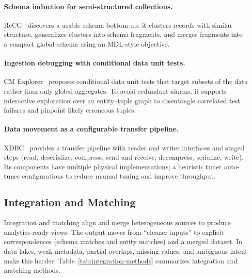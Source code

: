 \documentclass[sigconf,nonacm]{acmart}
\begin{document}
\paragraph{Schema induction for semi-structured collections.}
ReCG~\cite{10.14778/3681954.3682019} discovers a usable schema bottom-up: it clusters records with similar structure, generalizes clusters into schema fragments, and merges fragments into a compact global schema using an MDL-style objective.

\paragraph{Ingestion debugging with conditional data unit tests.}
CM Explorer~\cite{10.14778/3611540.3611595} proposes conditional data unit tests that target subsets of the data rather than only global aggregates. To avoid redundant alarms, it supports interactive exploration over an entity--tuple graph to disentangle correlated test failures and pinpoint likely erroneous tuples.

\paragraph{Data movement as a configurable transfer pipeline.}
XDBC~\cite{10.1145/3725294} provides a transfer pipeline with reader and writer interfaces and staged steps (read, deserialize, compress, send and receive, decompress, serialize, write). Its components have multiple physical implementations; a heuristic tuner auto-tunes configurations to reduce manual tuning and improve throughput.


\subsection{Integration and Matching}

Integration and matching align and merge heterogeneous sources to produce analytics-ready views. The output moves from ``cleaner inputs'' to explicit correspondences (schema matches and entity matches) and a merged dataset. In data lakes, weak metadata, partial overlaps, missing values, and ambiguous intent make this harder. Table~\ref{tab:integration-methods} summarizes integration and matching methods.
\end{document}
